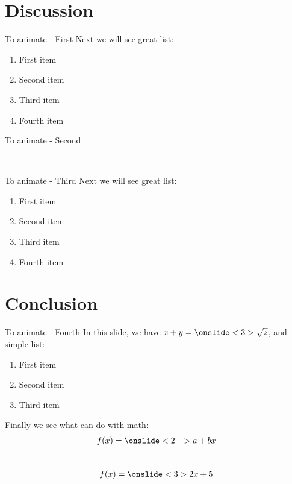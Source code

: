 \documentclass{beamer}
\begin{document}
\section{Discussion}
\begin{frame}{To animate - First}
    Next we will see great list: \pause
        \begin{enumerate}
            \item First item \pause
            \item Second item \pause
            \item Third item \pause
            \item Fourth item 
        \end{enumerate}  
\end{frame}

\begin{frame}{To animate - Second}
    
        \tiny
        \lipsum[1]\\
        \vspace{2cm}
        \pause
        
        \lipsum[2]
   
\end{frame}


\begin{frame}{To animate - Third}
    Next we will see great list:
        \begin{enumerate}
            \item<1-2> First item
            \item<3-> Second item
            \item<4> Third item
            \item<2> Fourth item 
        \end{enumerate}  
\end{frame}

\section{Conclusion}
\begin{frame}{To animate - Fourth}
    In this slide, we have 
       $x+y=\onslide<3>{\sqrt{z}}$, and simple list:
        \begin{enumerate}
            \item First item
            \item Second item
            \item Third item
        \end{enumerate}  
    Finally we see what can do with math:
    \begin{align}
        f(x)=\onslide<2->{a+bx}
    \end{align}    \\
    \begin{align*}
        f(x)=\onslide<3>{2x+5}
    \end{align*}    
\end{frame}
\end{document}
